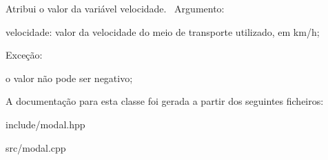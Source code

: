 Atribui o valor da variável velocidade.~\newline
 Argumento\+:
\begin{DoxyItemize}
\item velocidade\+: valor da velocidade do meio de transporte utilizado, em km/h;
\end{DoxyItemize}

Exceção\+:
\begin{DoxyItemize}
\item o valor não pode ser negativo;
\end{DoxyItemize}

A documentação para esta classe foi gerada a partir dos seguintes ficheiros\+:\begin{DoxyCompactItemize}
\item 
include/modal.\+hpp\item 
src/modal.\+cpp\end{DoxyCompactItemize}
